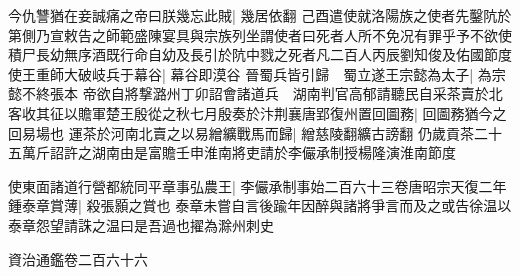 今仇讐猶在妾誠痛之帝曰朕幾忘此賊|{
	幾居依翻}
己酉遣使就洛陽族之使者先鑿阬於第側乃宣敕告之師範盛陳宴具與宗族列坐謂使者曰死者人所不免况有罪乎予不欲使積尸長幼無序酒既行命自幼及長引於阬中戮之死者凡二百人丙辰劉知俊及佑國節度使王重師大破岐兵于幕谷|{
	幕谷即漠谷}
晉蜀兵皆引歸　蜀立遂王宗懿為太子|{
	為宗懿不終張本}
帝欲自將撃潞州丁卯詔會諸道兵　湖南判官高郁請聽民自采茶賣於北客收其征以贍軍楚王殷從之秋七月殷奏於汴荆襄唐郢復州置回圖務|{
	回圖務猶今之回易場也}
運茶於河南北賣之以易繒纊戰馬而歸|{
	繒慈陵翻纊古謗翻}
仍歲貢茶二十五萬斤詔許之湖南由是富贍壬申淮南將吏請於李儼承制授楊隆演淮南節度

使東面諸道行營都統同平章事弘農王|{
	李儼承制事始二百六十三卷唐昭宗天復二年}
鍾泰章賞薄|{
	殺張顥之賞也}
泰章未嘗自言後踰年因醉與諸將爭言而及之或告徐温以泰章怨望請誅之温曰是吾過也擢為滁州刺史

資治通鑑卷二百六十六
